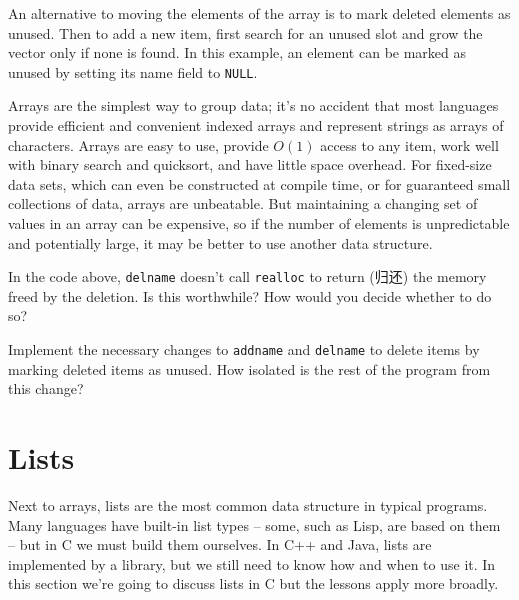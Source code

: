 An alternative to moving the elements of the array is to mark deleted
elements as unused. Then to add a new item, first search for an unused slot
and grow the vector only if none is found. In this example, an element can
be marked as unused by setting its name field to \verb'NULL'.

Arrays are the simplest way to group data; it's no accident that most
languages provide efficient and convenient indexed arrays and represent
strings as arrays of characters. Arrays are easy to use, provide $O(1)$
access to any item, work well with binary search and quicksort, and have
little space overhead. For fixed-size data sets, which can even be
constructed at compile time, or for guaranteed small collections of data,
arrays are unbeatable. But maintaining a changing set of values in an array
can be expensive, so if the number of elements is unpredictable and
potentially large, it may be better to use another data structure.

\begin{exercise}
    In the code above, \verb'delname' doesn't call \verb'realloc' to return
    (归还) the memory freed by the deletion. Is this worthwhile? How would
    you decide whether to do so?
\end{exercise}

\begin{exercise}
Implement the necessary changes to \verb'addname' and \verb'delname' to
delete items by marking deleted items as unused. How isolated is the rest
of the program from this change?
\end{exercise}

\section{Lists}
\label{sec:lists}

Next to arrays, lists are the most common data structure in typical
programs. Many languages have built-in list types -- some, such as Lisp,
are based on them -- but in C we must build them ourselves. In C++ and
Java, lists are implemented by a library, but we still need to know how and
when to use it. In this section we're going to discuss lists in C but the
lessons apply more broadly.

